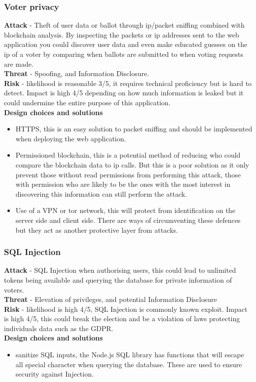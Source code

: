 \documentclass{entcs}
\begin{document}
\subsubsection{Voter privacy}
\textbf{Attack} - Theft of user data or ballot through ip/packet sniffing \cite{ansari2002packet} combined with blockchain analysis. By inspecting the packets or ip addresses sent to the web application you could discover user data and even make educated guesses on the ip of a voter by comparing when ballots are submitted to when voting requests are made. \\
\textbf{Threat} - Spoofing, and Information Disclosure. \\
\textbf{Risk} - likelihood is reasonable 3/5, it requires technical proficiency but is hard to detect. Impact is high 4/5 depending on how much information is leaked but it could undermine the entire purpose of this application.\\
\textbf{Design choices and solutions}
\begin{itemize}
    \item HTTPS, this is an easy solution to packet sniffing and should be implemented when deploying the web application.
    \item Permissioned blockchain, this is a potential method of reducing who could compare the blockchain data to ip calls. But this is a poor solution as it only prevent those without read permissions from performing this attack, those with permission who are likely to be the ones with the most interest in discovering this information can still perform the attack.
    \item Use of a VPN or tor network, this will protect from identification on the server side and client side. There are ways of circumventing these defences but they act as another protective layer from attacks.
\end{itemize}

\subsubsection{SQL Injection}
\textbf{Attack} - SQL Injection when authorising users, this could lead to unlimited tokens being available and querying the database for private information of voters. \\
\textbf{Threat} - Elevation of privileges, and potential Information Disclosure \\
\textbf{Risk} - likelihood is high 4/5, SQL Injection is commonly known exploit. Impact is high 4/5, this could break the election and be a violation of laws protecting individuals data such as the GDPR.\\
\textbf{Design choices and solutions}
\begin{itemize}
    \item sanitize SQL inputs, the Node.js SQL library has functions that will escape all special character when querying the database. These are used to ensure security against Injection.
\end{itemize}
\end{document}
